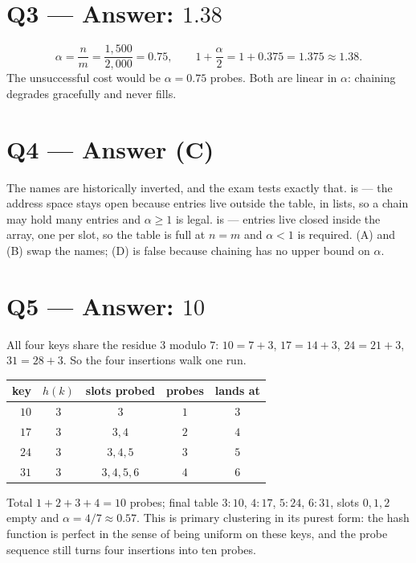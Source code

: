 \documentclass[11pt]{article}
\begin{document}
\section*{Q3 --- Answer: $1.38$}

\[
  \alpha = \frac{n}{m} = \frac{1{,}500}{2{,}000} = 0.75,
  \qquad
  1 + \frac{\alpha}{2} = 1 + 0.375 = 1.375 \approx 1.38 .
\]
The unsuccessful cost would be $\alpha = 0.75$ probes. Both are linear in $\alpha$: chaining degrades gracefully and never fills.

\section*{Q4 --- Answer (C)}

The names are historically inverted, and the exam tests exactly that.  is  --- the address space stays open because entries live outside the table, in lists, so a chain may hold many entries and $\alpha \ge 1$ is legal.  is  --- entries live closed inside the array, one per slot, so the table is full at $n = m$ and $\alpha < 1$ is required. (A) and (B) swap the names; (D) is false because chaining has no upper bound on $\alpha$.

\section*{Q5 --- Answer: $10$}

All four keys share the residue $3$ modulo $7$: $10 = 7+3$, $17 = 14+3$, $24 = 21+3$, $31 = 28+3$. So the four insertions walk one run.

\begin{center}
{\small
\begin{tabular}{rcccc}
  \toprule
  key & $h(k)$ & slots probed & probes & lands at \\
  \midrule
  $10$ & $3$ & $3$ & $1$ & $3$ \\
  $17$ & $3$ & $3,4$ & $2$ & $4$ \\
  $24$ & $3$ & $3,4,5$ & $3$ & $5$ \\
  $31$ & $3$ & $3,4,5,6$ & $4$ & $6$ \\
  \bottomrule
\end{tabular}}
\end{center}

Total $1+2+3+4 = 10$ probes; final table $3{:}10$, $4{:}17$, $5{:}24$, $6{:}31$, slots $0,1,2$ empty and $\alpha = 4/7 \approx 0.57$. This is primary clustering in its purest form: the hash function is perfect in the sense of being uniform on these keys, and the probe sequence still turns four insertions into ten probes.
\end{document}
